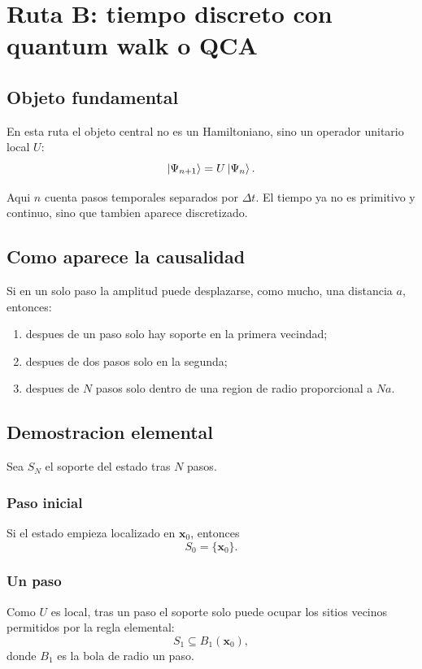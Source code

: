 \section{Ruta B: tiempo discreto con quantum walk o QCA}
\subsection{Objeto fundamental}
En esta ruta el objeto central no es un Hamiltoniano, sino un operador unitario local \(U\):
\begin{equation}
\ket{\Psi_{n+1}} = U\ket{\Psi_n}.
\label{c20:eq:disc-evol}
\end{equation}

Aqui \(n\) cuenta pasos temporales separados por \(\Delta t\). El tiempo ya no es primitivo y continuo, sino que tambien aparece discretizado.

\subsection{Como aparece la causalidad}
Si en un solo paso la amplitud puede desplazarse, como mucho, una distancia \(a\), entonces:
\begin{enumerate}[label=\arabic*.]
    \item despues de un paso solo hay soporte en la primera vecindad;
    \item despues de dos pasos solo en la segunda;
    \item despues de \(N\) pasos solo dentro de una region de radio proporcional a \(Na\).
\end{enumerate}

\subsection{Demostracion elemental}
Sea \(S_N\) el soporte del estado tras \(N\) pasos.

\subsubsection*{Paso inicial}
Si el estado empieza localizado en \(\bm{x}_0\), entonces
\begin{equation}
S_0 = \{\bm{x}_0\}.
\end{equation}

\subsubsection*{Un paso}
Como \(U\) es local, tras un paso el soporte solo puede ocupar los sitios vecinos permitidos por la regla elemental:
\begin{equation}
S_1 \subseteq B_1(\bm{x}_0),
\end{equation}
donde \(B_1\) es la bola de radio un paso.

